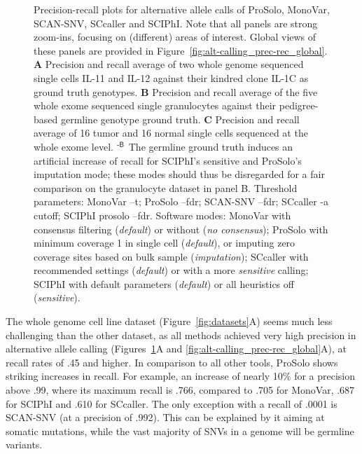 \documentclass[12pt,inline]{wlscirep}
\begin{document}
\begin{figure}[!tpb]
 \caption{
  Precision-recall plots for alternative allele calls of ProSolo, MonoVar, SCAN-SNV, SCcaller and SCIPhI.
  Note that all panels are strong zoom-ins, focusing on (different) areas of interest.
  Global views of these panels are provided in Figure~\ref{fig:alt-calling_prec-rec_global}.
  \textbf{A} Precision and recall average of two whole genome sequenced single cells IL-11 and IL-12 against their kindred clone IL-1C as ground truth genotypes.
  \textbf{B} Precision and recall average of the five whole exome sequenced single granulocytes against their pedigree-based germline genotype ground truth.
  \textbf{C} Precision and recall average of 16 tumor and 16 normal single cells sequenced at the whole exome level. \newline
  $^\text{\sffamily-B}$ The germline ground truth induces an artificial increase of recall for SCIPhI's sensitive and ProSolo's imputation mode; these modes should thus be disregarded for a fair comparison on the granulocyte dataset in panel B. \newline \footnotesize
  Threshold parameters:
  MonoVar {\ttfamily --t};
  ProSolo {\ttfamily --fdr};
  SCAN-SNV {\ttfamily --fdr};
  SCcaller {\ttfamily -a cutoff};
  SCIPhI {\ttfamily prosolo --fdr}.
  Software modes:
  MonoVar with consensus filtering ({\itshape default}) or without ({\itshape no consensus});
  ProSolo with minimum coverage 1 in single cell ({\itshape default}), or imputing zero coverage sites based on bulk sample ({\itshape imputation});
  SCcaller with recommended settings ({\itshape default}) or with a more {\itshape sensitive} calling;
  SCIPhI with default parameters ({\itshape default}) or all heuristics off ({\itshape sensitive}).
 }
\label{fig:alt-calling_prec-rec}
\end{figure}

The whole genome cell line dataset (Figure~\ref{fig:datasets}A) seems much less challenging than the other dataset, as all methods achieved very high precision in alternative allele calling (Figures~\ref{fig:alt-calling_prec-rec}A and \ref{fig:alt-calling_prec-rec_global}A), at recall rates of .45 and higher. 
In comparison to all other tools, ProSolo shows striking increases in recall.
For example, an increase of nearly 10\% for a precision above .99, where its maximum recall is .766, compared to .705 for MonoVar, .687 for SCIPhI and .610 for SCcaller.
The only exception with a recall of .0001 is SCAN-SNV (at a precision of .992).
This can be explained by it aiming at somatic mutations, while the vast majority of SNVs in a genome will be germline variants.
\end{document}
